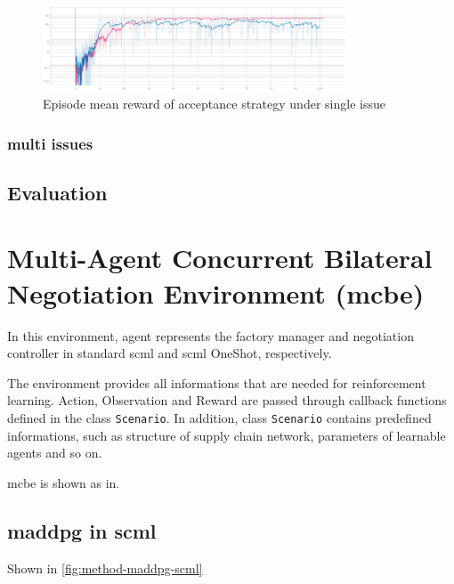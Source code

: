 \begin{figure}[htbp]
\centering
\includegraphics[width=0.80\textwidth]{./images/ac_s_dqn_ppo1_log_EpRe.png}
\caption{Episode mean reward of acceptance strategy under single issue}
\label{fig:acceptance-single-issue}
\end{figure}

\subsubsection{multi issues}

\subsection{Evaluation}

\section{Multi-Agent Concurrent Bilateral Negotiation Environment (\gls{mcbe})}
In this environment, agent represents the factory manager and negotiation controller in standard \gls{scml} and \gls{scml} OneShot, respectively.

The environment provides all informations that are needed for reinforcement learning. Action, Observation and Reward are passed through callback functions defined in the class \texttt{Scenario}. In addition, class \texttt{Scenario} contains predefined informations, such as structure of supply chain network, parameters of learnable agents and so on.

\gls{mcbe} is shown as in.

\subsection{\gls{maddpg} in \gls{scml}}
Shown in \ref{fig:method-maddpg-scml}

